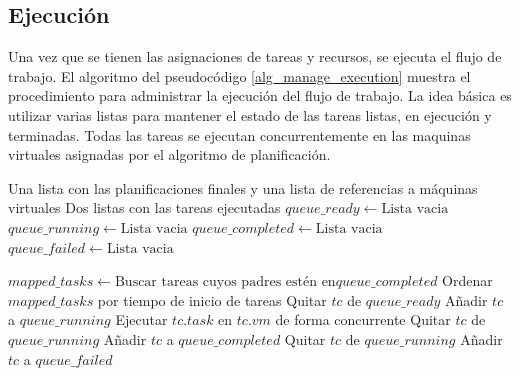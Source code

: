 \subsection{Ejecución}

Una vez que se tienen las asignaciones de tareas y recursos, se ejecuta el flujo de trabajo. El algoritmo del pseudoc\'odigo \ref{alg_manage_execution} muestra el procedimiento para administrar la ejecuci\'on del flujo de trabajo. La idea b\'asica es utilizar varias listas para mantener el estado de las tareas listas, en ejecuci\'on y terminadas. Todas las tareas se ejecutan concurrentemente en las m\;aquinas virtuales asignadas por el algoritmo de planificaci\'on.

\begin{algorithm}
\caption{Ejecuci\'on de tareas en las m\'aquinas virtuales}
\label{alg_manage_execution}
\begin{algorithmic}
\Require Una lista con las planificaciones finales y una lista de referencias a m\'aquinas virtuales
\Ensure Dos listas con las tareas ejecutadas
    \State $queue\_ready \gets \text{Lista vacia}$
    \State $queue\_running \gets \text{Lista vacia}$
    \State $queue\_completed \gets \text{Lista vacia}$
    \State $queue\_failed \gets \text{Lista vacia}$

    \EndFor

        \State $mapped\_tasks \gets \text{Buscar tareas cuyos padres est\'en en} queue\_completed$
        \State Ordenar $mapped\_tasks$ por tiempo de inicio de tareas
            \State Quitar $tc$ de $queue\_ready$
            \State Añadir $tc$ a $queue\_running$
            \State Ejecutar $tc.task$ en $tc.vm$ de forma concurrente
        \EndFor
                \State Quitar $tc$ de $queue\_running$
                \State Añadir $tc$ a $queue\_completed$
                \State Quitar $tc$ de $queue\_running$
                \State Añadir $tc$ a $queue\_failed$
            \EndIf
        \EndFor
    \EndWhile
\EndProcedure
\end{algorithmic}
\end{algorithm}


